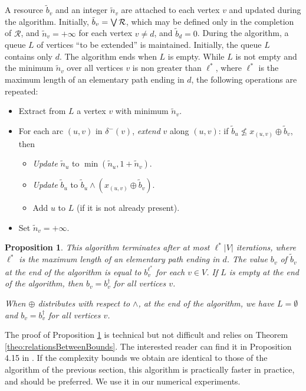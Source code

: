 \documentclass[11pt]{amsart}
\theoremstyle{plain}
\newtheorem{prop}[theo]{Proposition}
\theoremstyle{remark}
\newcommand{\rplus}{\oplus}
\newcommand{\nrleq}{\nleqslant}
\newcommand{\rset}{\mathcal{R}}
\newcommand{\re}{x}
\newcommand{\meet}{\wedge} \newcommand{\bigmeet}{\bigwedge}
\begin{document}
A resource $\tilde{b}_{v}$ and an integer $\tilde{n}_{v}$ are attached to each vertex $v$ and updated during the algorithm. Initially, $\tilde{b}_v=\bigjoin \rset$, which may be defined only in the completion of $\rset$, and $\tilde{n}_v=+\infty$ for each vertex $v\neq d$, and $\tilde{b}_d=0$.
During the algorithm, a queue $L$ of vertices ``to be extended'' is maintained. Initially, the queue $L$ contains only $d$. The algorithm ends when $L$ is empty. While $L$ is not empty and the minimum $\tilde{n}_{v}$ over all vertices $v$ is non greater than $\ell^{*}$, where $\ell^{*}$ is the maximum length of an elementary path ending in $d$, the following operations are repeated:
\begin{itemize}
\item Extract from $L$ a vertex $v$ with minimum $\tilde{n}_v$. 
\item For each arc $(u,v)$ in $\delta^-(v)$, {\em extend} $v$ along $(u,v)$: if $\tilde{b}_u \nrleq \re_{(u,v)}\rplus \tilde{b}_{v}$, then
	\begin{itemize}
	\item {\em Update} $\tilde{n}_{u} $ to $ \min(\tilde{n}_{u}, 1 + \tilde{n}_{v})$.
	\item {\em Update} $\tilde{b}_{u}$ to $\tilde{b}_{u} \meet (\re_{(u,v)}\rplus \tilde{b}_{v})$.
	\item Add $u$ to $L$ (if it is not already present).
	\end{itemize}
\item Set $\tilde{n}_{v} = +\infty$.
\end{itemize}



\begin{prop}\label{prop:MeetLbFastComputation}
This algorithm terminates after at most $\ell^{*}|V|$ iterations, where $\ell^{*}$ is the maximum length of an elementary path ending in $d$. The value $b_{v}$ of $\tilde{b}_v$ at the end of the algorithm is equal to $b_{v}^{\ell^{*}}$ for each $v\in V$. If $L$ is empty at the end of the algorithm, then $b_{v} = b_{v}^{\dagger}$ for all vertices $v$.

When  $\rplus$ distributes with respect to $\meet$, at the end of the algorithm, we have $L = \emptyset$ and $b_{v} = b_{v}^{\dagger}$ for all vertices $v$.
\end{prop}

The proof of Proposition \ref{prop:MeetLbFastComputation} is technical but not difficult and relies on Theorem \ref{theo:relationsBetweenBounds}. The interested reader can find it in Proposition 4.15 in \cite{parmentier2016thesis}. If the complexity bounds we obtain are identical to those of the algorithm of the previous section, this algorithm is practically faster in practice, and should be preferred. We use it in our numerical experiments.
\end{document}
